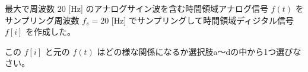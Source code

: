 最大で周波数 $20$ [Hz] のアナログサイン波を含む時間領域アナログ信号 $f(t)$ をサンプリング周波数 $f_s = 20$ [Hz] でサンプリングして時間領域ディジタル信号 $f[i]$ を作成した。\par
この $f[i]$ と元の $f(t)$ はどの様な関係になるか選択肢a〜dの中から1つ選びなさい。
